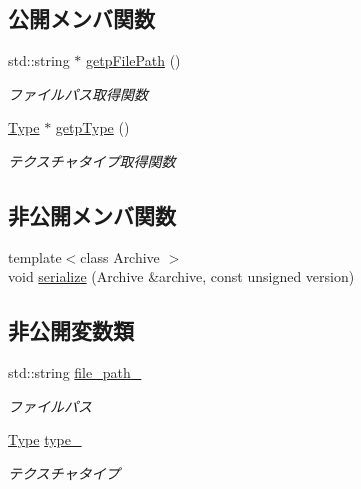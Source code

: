\subsection*{公開メンバ関数}
\begin{DoxyCompactItemize}
\item 
std\+::string $\ast$ \mbox{\hyperlink{class_md_bin_data_1_1_material_1_1_texture_a21fe2c86886f96f50b946f7446063e5a}{getp\+File\+Path}} ()
\begin{DoxyCompactList}\small\item\em ファイルパス取得関数 \end{DoxyCompactList}\item 
\mbox{\hyperlink{class_md_bin_data_1_1_material_1_1_texture_a30fadb7216d0650de284e2fd875868ae}{Type}} $\ast$ \mbox{\hyperlink{class_md_bin_data_1_1_material_1_1_texture_a88cd7f1ff4374f7cd0e915bbb875f7c9}{getp\+Type}} ()
\begin{DoxyCompactList}\small\item\em テクスチャタイプ取得関数 \end{DoxyCompactList}\end{DoxyCompactItemize}
\subsection*{非公開メンバ関数}
\begin{DoxyCompactItemize}
\item 
{\footnotesize template$<$class Archive $>$ }\\void \mbox{\hyperlink{class_md_bin_data_1_1_material_1_1_texture_ad60d5228b11672fc37aca5a94ea8f57f}{serialize}} (Archive \&archive, const unsigned version)
\end{DoxyCompactItemize}
\subsection*{非公開変数類}
\begin{DoxyCompactItemize}
\item 
std\+::string \mbox{\hyperlink{class_md_bin_data_1_1_material_1_1_texture_a946fca195103d3116f0610938c1262b5}{file\+\_\+path\+\_\+}}
\begin{DoxyCompactList}\small\item\em ファイルパス \end{DoxyCompactList}\item 
\mbox{\hyperlink{class_md_bin_data_1_1_material_1_1_texture_a30fadb7216d0650de284e2fd875868ae}{Type}} \mbox{\hyperlink{class_md_bin_data_1_1_material_1_1_texture_a290cde06bb0ddb5d83776f9a49bafdf4}{type\+\_\+}}
\begin{DoxyCompactList}\small\item\em テクスチャタイプ \end{DoxyCompactList}\end{DoxyCompactItemize}
